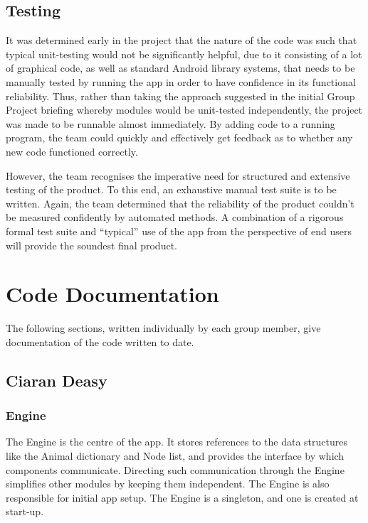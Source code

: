 \documentclass[12pt,a4paper,twoside]{article}
\begin{document}
\subsection{Testing}

It was determined early in the project that the nature of the code was such that typical unit-testing would not be significantly helpful, due to it consisting of a lot of graphical code, as well as standard Android library systems, that needs to be manually tested by running the app in order to have confidence in its functional reliability. 
Thus, rather than taking the approach suggested in the initial Group Project briefing whereby modules would be unit-tested independently, the project was made to be runnable almost immediately. 
By adding code to a running program, the team could quickly and effectively get feedback as to whether any new code functioned correctly.

However, the team recognises the imperative need for structured and extensive testing of the product. 
To this end, an exhaustive manual test suite is to be written. 
Again, the team determined that the reliability of the product couldn't be measured confidently by automated methods. 
A combination of a rigorous formal test suite and ``typical'' use of the app from the perspective of end users will provide the soundest final product.

\section{Code Documentation}

The following sections, written individually by each group member, give documentation of the code written to date.

\subsection{Ciaran Deasy}

\subsubsection{Engine}

The Engine is the centre of the app. 
It stores references to the data structures like the Animal dictionary and Node list, and provides the interface by which components communicate. 
Directing such communication through the Engine simplifies other modules by keeping them independent. The Engine is also responsible for initial app setup.
The Engine is a singleton, and one is created at start-up.
\end{document}
